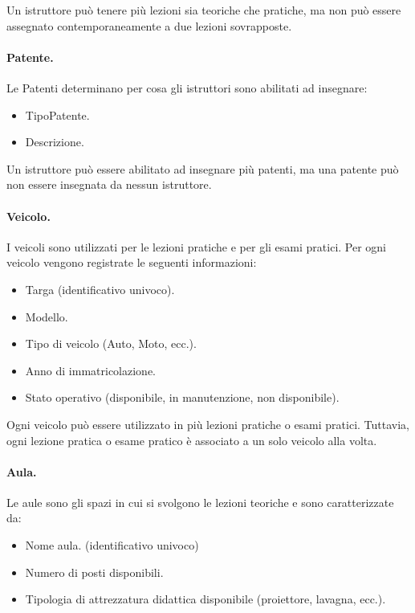 \documentclass[10pt,twoside]{article}
\begin{document}
{    Un istruttore può tenere più lezioni sia teoriche che pratiche, ma non può essere assegnato contemporaneamente a due lezioni sovrapposte.
    

    \paragraph{Patente.}
    Le Patenti determinano per cosa gli istruttori sono abilitati ad insegnare:
    
    \begin{itemize}
        \item TipoPatente.
        \item Descrizione.
    \end{itemize}

    Un istruttore può essere abilitato ad insegnare più patenti, ma una patente può non essere insegnata da nessun istruttore.

    \paragraph{Veicolo.}
    I veicoli sono utilizzati per le lezioni pratiche e per gli esami pratici. Per ogni veicolo vengono registrate le seguenti informazioni:
    
    \begin{itemize}
        \item Targa (identificativo univoco).
        \item Modello.
        \item Tipo di veicolo (Auto, Moto, ecc.).
        \item Anno di immatricolazione.
        \item Stato operativo (disponibile, in manutenzione, non disponibile).
    \end{itemize}

    Ogni veicolo può essere utilizzato in più lezioni pratiche o esami pratici. Tuttavia, ogni lezione pratica o esame pratico è associato a un solo veicolo alla volta.
    

    \paragraph{Aula.}
    Le aule sono gli spazi in cui si svolgono le lezioni teoriche e sono caratterizzate da:

    \begin{itemize}
        \item Nome aula. (identificativo univoco)
        \item Numero di posti disponibili.
        \item Tipologia di attrezzatura didattica disponibile (proiettore, lavagna, ecc.).
    \end{itemize}

}
\end{document}
